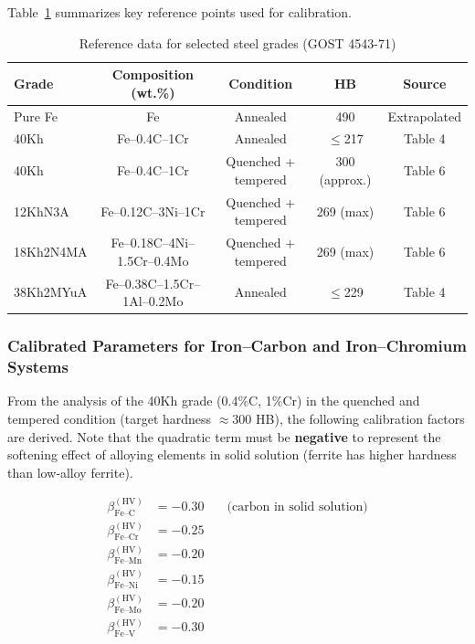 \documentclass[12pt,a4paper]{article}
\begin{document}
	Table~\ref{tab:steel_gost4543} summarizes key reference points used for calibration.
	
	\begin{table}[htbp]
		\centering
		\caption{Reference data for selected steel grades (GOST 4543-71)}
		\label{tab:steel_gost4543}
		\begin{tabular}{lcccc}
			\toprule
			\textbf{Grade} & \textbf{Composition (wt.\%)} & \textbf{Condition} & \textbf{HB} & \textbf{Source} \\
			\midrule
			Pure Fe & Fe & Annealed & 490 & Extrapolated \\
			40Kh & Fe–0.4C–1Cr & Annealed & $\le$217 & Table 4 \\
			40Kh & Fe–0.4C–1Cr & Quenched + tempered & 300 (approx.) & Table 6 \\
			12KhN3A & Fe–0.12C–3Ni–1Cr & Quenched + tempered & 269 (max) & Table 6 \\
			18Kh2N4MA & Fe–0.18C–4Ni–1.5Cr–0.4Mo & Quenched + tempered & 269 (max) & Table 6 \\
			38Kh2MYuA & Fe–0.38C–1.5Cr–1Al–0.2Mo & Annealed & $\le$229 & Table 4 \\
			\bottomrule
		\end{tabular}
	\end{table}
	
	\subsubsection{Calibrated Parameters for Iron–Carbon and Iron–Chromium Systems}
	
	From the analysis of the 40Kh grade (0.4\%C, 1\%Cr) in the quenched and tempered condition (target hardness $\approx$300 HB), the following calibration factors are derived. Note that the quadratic term must be \textbf{negative} to represent the softening effect of alloying elements in solid solution (ferrite has higher hardness than low‑alloy ferrite).
	
	\[
	\begin{aligned}
		\beta_{\text{Fe–C}}^{(\text{HV})} &= -0.30 \quad &\text{(carbon in solid solution)} \\
		\beta_{\text{Fe–Cr}}^{(\text{HV})} &= -0.25 \\
		\beta_{\text{Fe–Mn}}^{(\text{HV})} &= -0.20 \\
		\beta_{\text{Fe–Ni}}^{(\text{HV})} &= -0.15 \\
		\beta_{\text{Fe–Mo}}^{(\text{HV})} &= -0.20 \\
		\beta_{\text{Fe–V}}^{(\text{HV})} &= -0.30
	\end{aligned}
	\]
	
\end{document}

